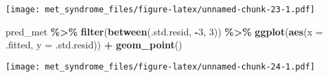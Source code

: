 \documentclass[
]{article}
\newenvironment{Shaded}{\begin{snugshade}}{\end{snugshade}}
\newcommand{\AttributeTok}[1]{\textcolor[rgb]{0.13,0.29,0.53}{#1}}
\newcommand{\DecValTok}[1]{\textcolor[rgb]{0.00,0.00,0.81}{#1}}
\newcommand{\FunctionTok}[1]{\textcolor[rgb]{0.13,0.29,0.53}{\textbf{#1}}}
\newcommand{\NormalTok}[1]{#1}
\newcommand{\SpecialCharTok}[1]{\textcolor[rgb]{0.81,0.36,0.00}{\textbf{#1}}}
\begin{document}
\texttt{[image: met\_syndrome\_files/figure-latex/unnamed-chunk-23-1.pdf]}

\begin{Shaded}
\begin{Highlighting}[]
\NormalTok{pred\_met }\SpecialCharTok{\%\textgreater{}\%} 
  \FunctionTok{filter}\NormalTok{(}\FunctionTok{between}\NormalTok{(.std.resid, }\SpecialCharTok{{-}}\DecValTok{3}\NormalTok{, }\DecValTok{3}\NormalTok{)) }\SpecialCharTok{\%\textgreater{}\%} 
  \FunctionTok{ggplot}\NormalTok{(}\FunctionTok{aes}\NormalTok{(}\AttributeTok{x =}\NormalTok{ .fitted, }\AttributeTok{y =}\NormalTok{ .std.resid)) }\SpecialCharTok{+}
  \FunctionTok{geom\_point}\NormalTok{() }
\end{Highlighting}
\end{Shaded}

\texttt{[image: met\_syndrome\_files/figure-latex/unnamed-chunk-24-1.pdf]}
\end{document}
